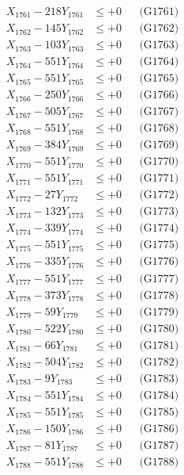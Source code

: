\documentclass[a4paper,10pt]{article}
\begin{document}
{\begin{align}
\allowbreak
X_{1761} - 218Y_{1761} &\leq +0 && \text{(G1761)} \\
X_{1762} - 145Y_{1762} &\leq +0 && \text{(G1762)} \\
X_{1763} - 103Y_{1763} &\leq +0 && \text{(G1763)} \\
X_{1764} - 551Y_{1764} &\leq +0 && \text{(G1764)} \\
X_{1765} - 551Y_{1765} &\leq +0 && \text{(G1765)} \\
X_{1766} - 250Y_{1766} &\leq +0 && \text{(G1766)} \\
X_{1767} - 505Y_{1767} &\leq +0 && \text{(G1767)} \\
X_{1768} - 551Y_{1768} &\leq +0 && \text{(G1768)} \\
X_{1769} - 384Y_{1769} &\leq +0 && \text{(G1769)} \\
X_{1770} - 551Y_{1770} &\leq +0 && \text{(G1770)} \\
\allowbreak
X_{1771} - 551Y_{1771} &\leq +0 && \text{(G1771)} \\
X_{1772} - 27Y_{1772} &\leq +0 && \text{(G1772)} \\
X_{1773} - 132Y_{1773} &\leq +0 && \text{(G1773)} \\
X_{1774} - 339Y_{1774} &\leq +0 && \text{(G1774)} \\
X_{1775} - 551Y_{1775} &\leq +0 && \text{(G1775)} \\
X_{1776} - 335Y_{1776} &\leq +0 && \text{(G1776)} \\
X_{1777} - 551Y_{1777} &\leq +0 && \text{(G1777)} \\
X_{1778} - 373Y_{1778} &\leq +0 && \text{(G1778)} \\
X_{1779} - 59Y_{1779} &\leq +0 && \text{(G1779)} \\
X_{1780} - 522Y_{1780} &\leq +0 && \text{(G1780)} \\
\allowbreak
X_{1781} - 66Y_{1781} &\leq +0 && \text{(G1781)} \\
X_{1782} - 504Y_{1782} &\leq +0 && \text{(G1782)} \\
X_{1783} - 9Y_{1783} &\leq +0 && \text{(G1783)} \\
X_{1784} - 551Y_{1784} &\leq +0 && \text{(G1784)} \\
X_{1785} - 551Y_{1785} &\leq +0 && \text{(G1785)} \\
X_{1786} - 150Y_{1786} &\leq +0 && \text{(G1786)} \\
X_{1787} - 81Y_{1787} &\leq +0 && \text{(G1787)} \\
X_{1788} - 551Y_{1788} &\leq +0 && \text{(G1788)} \\

\end{align}}
\end{document}
